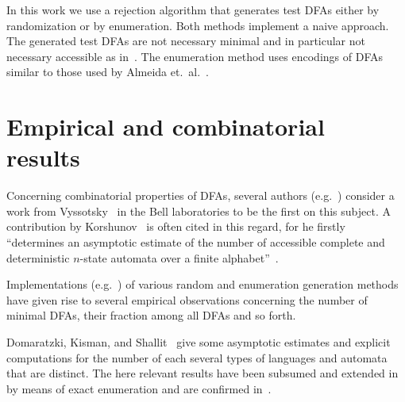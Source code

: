 In this work we use a rejection algorithm that generates test DFAs either by randomization or by enumeration. Both methods implement a naive approach. The generated test DFAs are not necessary minimal and in particular not necessary accessible as in~\cite{CN12}. The enumeration method uses encodings of DFAs similar to those used by Almeida et.\ al.~\cite{RMA05}.


\section{Empirical and combinatorial results}

Concerning combinatorial properties of DFAs, several authors (e.g.~\cite{BN07, DKS02, HJ14}) consider a work from Vyssotsky~\cite{Vys59} in the Bell laboratories to be the first on this subject. A contribution by Korshunov~\cite{Kor78} is often cited in this regard, for he firstly ``determines an asymptotic estimate of the number of accessible complete and deterministic $n$-state automata over a finite alphabet''~\cite{BDS11}.

Implementations (e.g.~\cite{AAA09, BDN07}) of various random and enumeration generation methods have given rise to several empirical observations concerning the number of minimal DFAs, their fraction among all DFAs and so forth.

Domaratzki, Kisman, and Shallit~\cite{DKS02} give some asymptotic estimates and explicit computations for the number of each several types of languages and automata that are distinct. The here relevant results have been subsumed and extended in~\cite[p. 8]{AMR09} by means of exact enumeration and are confirmed in~\cite{BDN07}.

